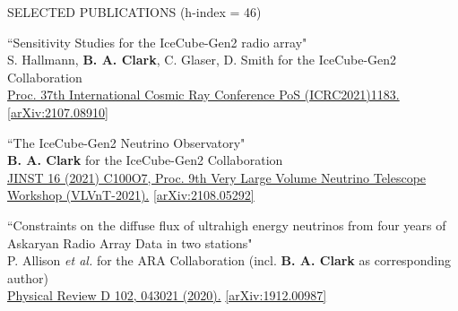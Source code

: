 \documentclass{resume} %
\begin{document}
\begin{rSection}{SELECTED PUBLICATIONS (h-index = 46)}
\begin{etaremune}
  \item ``Sensitivity Studies for the IceCube-Gen2 radio array" \\
 S. Hallmann, \textbf{B. A. Clark}, C. Glaser, D. Smith for the IceCube-Gen2 Collaboration \\ \href{https://doi.org/10.22323/1.395.1183}{Proc. 37th International Cosmic Ray Conference PoS (ICRC2021)1183.}  \href{https://arxiv.org/abs/2107.08910}{[arXiv:2107.08910]}


\item ``The IceCube-Gen2 Neutrino Observatory" \\
\textbf{B. A. Clark} for the IceCube-Gen2 Collaboration \\ \href{https://doi.org/10.1088/1748-0221/16/10/C10007}{JINST 16 (2021) C100O7, Proc. 9th Very Large Volume Neutrino Telescope Workshop (VLVnT-2021).}  \href{https://arxiv.org/abs/2108.05292}{[arXiv:2108.05292]}



  \item ``Constraints on the diffuse flux of ultrahigh energy neutrinos from four years of Askaryan Radio Array Data in two stations" \\
 P. Allison {\it et al.} for the ARA Collaboration (incl. \textbf{B. A. Clark} as corresponding author)\\ \href{https://doi.org/10.1103/PhysRevD.102.043021}{Physical Review D 102, 043021 (2020).}  \href{https://arxiv.org/abs/1912.00987}{[arXiv:1912.00987]}



\end{etaremune}
\end{rSection}
\end{document}
